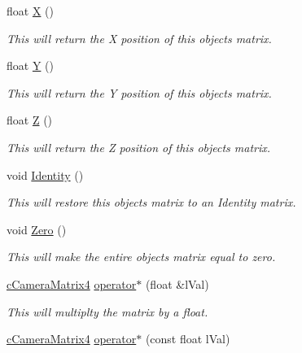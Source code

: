 \begin{DoxyCompactItemize}
float \hyperlink{classc_camera_matrix4_a0133c16b734fa93e767ea89964799fb5}{X} ()
\begin{DoxyCompactList}\small\item\em This will return the X position of this objects matrix. \item\end{DoxyCompactList}\item 
float \hyperlink{classc_camera_matrix4_aec72cb78c62b2e0970824262b0b4aa1f}{Y} ()
\begin{DoxyCompactList}\small\item\em This will return the Y position of this objects matrix. \item\end{DoxyCompactList}\item 
float \hyperlink{classc_camera_matrix4_a7e3030fcedbd3b74270b26ea2b61904c}{Z} ()
\begin{DoxyCompactList}\small\item\em This will return the Z position of this objects matrix. \item\end{DoxyCompactList}\item 
void \hyperlink{classc_camera_matrix4_a23a05c1aff8a58dc662f5b871b422c17}{Identity} ()
\begin{DoxyCompactList}\small\item\em This will restore this objects matrix to an Identity matrix. \item\end{DoxyCompactList}\item 
void \hyperlink{classc_camera_matrix4_a1ec81a7ec3274f89d2b8fb94923345c0}{Zero} ()
\begin{DoxyCompactList}\small\item\em This will make the entire objects matrix equal to zero. \item\end{DoxyCompactList}\item 
\hyperlink{classc_camera_matrix4}{cCameraMatrix4} \hyperlink{classc_camera_matrix4_a975232c74548b9af68354bf6c19351d8}{operator$\ast$} (float \&lVal)
\begin{DoxyCompactList}\small\item\em This will multiplty the matrix by a float. \item\end{DoxyCompactList}\item 
\hyperlink{classc_camera_matrix4}{cCameraMatrix4} \hyperlink{classc_camera_matrix4_a41e56ee4a22ed37543c120d663e4bc3c}{operator$\ast$} (const float lVal)

\end{DoxyCompactItemize}
